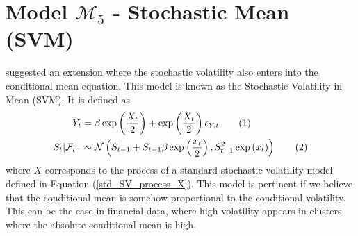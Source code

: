 \documentclass[11pt,a4,twosided,singlespacing,titlepagenumber=on]{scrreprt}
\numberwithin{equation}{chapter} %
\theoremstyle{remark}
\newcommand\numberthis{\addtocounter{equation}{1}\tag{\theequation}}
\begin{document}
\section{Model $\mathcal{M}_5$ - Stochastic Mean (SVM)}
\cite{koopman2002} suggested an extension where the stochastic volatility also enters into the conditional mean equation. This model is known as the Stochastic Volatility in Mean (SVM). It is defined as
\begin{align*}
Y_t 			 &= \beta \exp\left(\frac{X_t}{2}\right) + \exp\left(\frac{X_t}{2}\right) \epsilon_{Y,t} \numberthis\\
S_t | \mathcal{F}_{t^-}  &\sim \mathcal{N} \left(S_{t-1} + S_{t-1} \beta \exp\left(\frac{x_t}{2}\right), S_{t-1}^2 \exp\left(x_t\right) \right) \numberthis
\end{align*}
where $X$ corresponds to the process of a standard stochastic volatility model defined in Equation (\ref{std_SV_process_X}). This model is pertinent if we believe that the conditional mean is somehow proportional to the conditional volatility. This can be the case in financial data, where high volatility appears in clusters where the absolute conditional mean is high.
\end{document}
